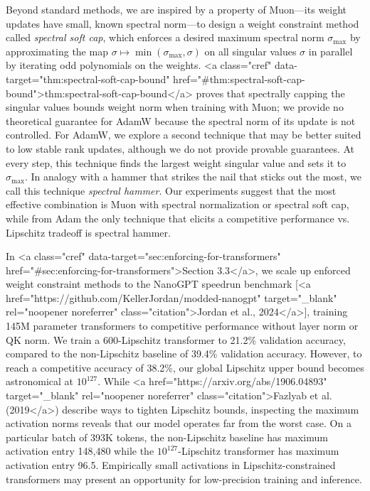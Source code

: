 Beyond standard methods, we are inspired by a property of Muon---its weight updates have small, known spectral norm---to design a weight constraint method called \textit{spectral soft cap}, which enforces a desired maximum spectral norm $\sigma_\text{max}$ by approximating the map $\sigma \mapsto \min(\sigma_\text{max}, \sigma)$ on all singular values $\sigma$ in parallel by iterating odd polynomials on the weights. <a class="cref" data-target="thm:spectral-soft-cap-bound" href="#thm:spectral-soft-cap-bound">thm:spectral-soft-cap-bound</a> proves that spectrally capping the singular values bounds weight norm when training with Muon; we provide no theoretical guarantee for AdamW because the spectral norm of its update is not controlled. For AdamW, we explore a second technique that may be better suited to low stable rank updates, although we do not provide provable guarantees. At every step, this technique finds the largest weight singular value and sets it to $\sigma_\text{max}$. In analogy with a hammer that strikes the nail that sticks out the most, we call this technique \textit{spectral hammer}. Our experiments suggest that the most effective combination is Muon with spectral normalization or spectral soft cap, while from Adam the only technique that elicits a competitive performance vs. Lipschitz tradeoff is spectral hammer.

In <a class="cref" data-target="sec:enforcing-for-transformers" href="#sec:enforcing-for-transformers">Section 3.3</a>, we scale up enforced weight constraint methods to the NanoGPT speedrun benchmark [<a href="https://github.com/KellerJordan/modded-nanogpt" target="_blank" rel="noopener noreferrer" class="citation">Jordan et al., 2024</a>], training 145M parameter transformers to competitive performance without layer norm or QK norm. We train a $600$-Lipschitz transformer to 21.2\% validation accuracy, compared to the non-Lipschitz baseline of 39.4\% validation accuracy. However, to reach a competitive accuracy of 38.2\%, our global Lipschitz upper bound becomes astronomical at $10^{127}$. While <a href="https://arxiv.org/abs/1906.04893" target="_blank" rel="noopener noreferrer" class="citation">Fazlyab et al. (2019</a>) describe ways to tighten Lipschitz bounds, inspecting the maximum activation norms reveals that our model operates far from the worst case. On a particular batch of 393K tokens, the non-Lipschitz baseline has maximum activation entry 148,480 while the $10^{127}$-Lipschitz transformer has maximum activation entry 96.5. Empirically small activations in Lipschitz-constrained transformers may present an opportunity for low-precision training and inference.

